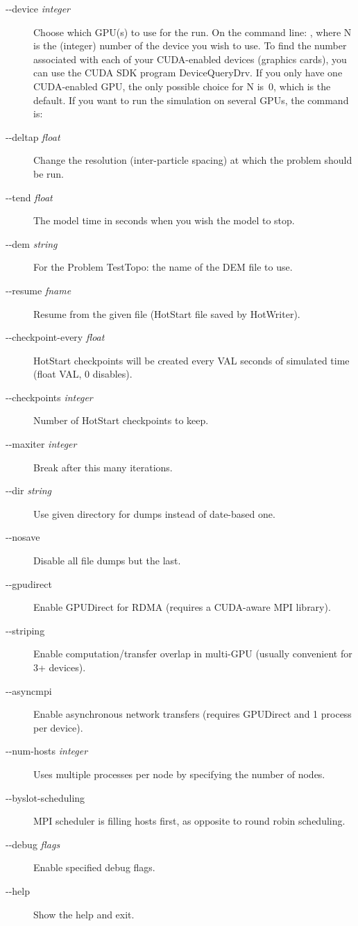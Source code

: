 \documentclass{../GPUSPHtemplate}
\begin{document}
\begin{description}
\item [-{}-device \emph{integer}]
Choose which GPU(s) to use for the run.
On the command line: , where N is the
(integer) number of the device you wish to use. 
To find the number associated with each of your CUDA-enabled 
devices (graphics cards), you
can use the CUDA SDK program DeviceQueryDrv. If you only have one
CUDA-enabled GPU, the only possible choice for N is~0, which is the
default.
If you want to run the simulation on several GPUs, the command is:
\item [-{}-deltap \emph{float}]
Change the resolution (inter-particle spacing) at which the problem
should be run.
\item [-{}-tend \emph{float}]
The model time in seconds when you wish the model to stop.
\item [-{}-dem \emph{string}]
For the Problem TestTopo: the name of the DEM file to use.
\item [-{}-resume \emph{fname}]
Resume from the given file (HotStart file saved by HotWriter).
\item [-{}-checkpoint-every \emph{float}]
HotStart checkpoints will be created every VAL seconds of simulated time (float VAL, 0 disables).
\item [-{}-checkpoints \emph{integer}]
Number of HotStart checkpoints to keep.
\item [-{}-maxiter \emph{integer}]
Break after this many iterations.
\item [-{}-dir \emph{string}]
Use given directory for dumps instead of date-based one.
\item [-{}-nosave]
Disable all file dumps but the last.
\item [-{}-gpudirect]
Enable GPUDirect for RDMA (requires a CUDA-aware MPI library).
\item [-{}-striping]
Enable computation/transfer overlap in multi-GPU (usually convenient for 3+ devices).
\item [-{}-asyncmpi]
Enable asynchronous network transfers (requires GPUDirect and 1 process per device).
\item [-{}-num-hosts \emph{integer}]
Uses multiple processes per node by specifying the number of nodes.
\item [-{}-byslot-scheduling]
MPI scheduler is filling hosts first, as opposite to round robin scheduling.
\item [-{}-debug \emph{flags}]
Enable specified debug flags.
\item [-{}-help]
Show the help and exit.
\end{description}
\end{document}
